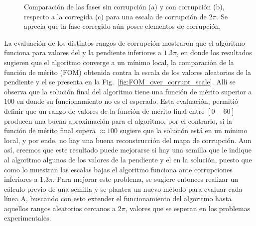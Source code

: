 \begin{figure}[ht!]
	\caption[Fase recuperada para una escala de corrupción aleatoria de $2\pi$]{Comparación de las fases sin corrupción (a) y con corrupción (b), respecto a la corregida (c) para una escala de corrupción de $2\pi$. Se aprecia que la fase corregido aún posee elementos de corrupción.}
	\label{fig:2pi_phase}
\end{figure}



La evaluación de los distintos rangos de corrupción mostraron que el algoritmo funciona para valores del \offset y la pendiente inferiores a $1.3\pi$, en donde los resultados sugieren que el algoritmo converge a un mínimo local, la comparación de la función de mérito (FOM) obtenida contra la escala de los valores aleatorios de la pendiente y el \offset se presenta en la Fig.~\ref{fig:FOM_over_corrupt_scale}. Allí se observa que la solución final del algoritmo tiene una función de mérito superior a $100$ en donde su funcionamiento no es el esperado. Esta evaluación, permitió definir que un rango de valores de la función de mérito final entre $[0-60]$ producen una buena aproximación para el algoritmo, por el contrario, si la función de mérito final supera $\approx100$ sugiere que la solución está en un mínimo local, y por ende, no hay una buena reconstrucción del mapa de corrupción. Aun así, creemos que este resultado puede mejorarse si hay una semilla que le indique al algoritmo algunos de los valores de la pendiente y el \offset en la solución, puesto que como lo muestran las escalas bajas el algoritmo funciona ante corrupciones inferiores a $1.3\pi$. Para mejorar este problema, se sugiere entonces realizar un cálculo previo de una semilla y se plantea un nuevo método para evaluar cada línea A, buscando con esto extender el funcionamiento del algoritmo hasta aquellos rangos aleatorios cercanos a $2\pi$, valores que se esperan en los problemas experimentales.


